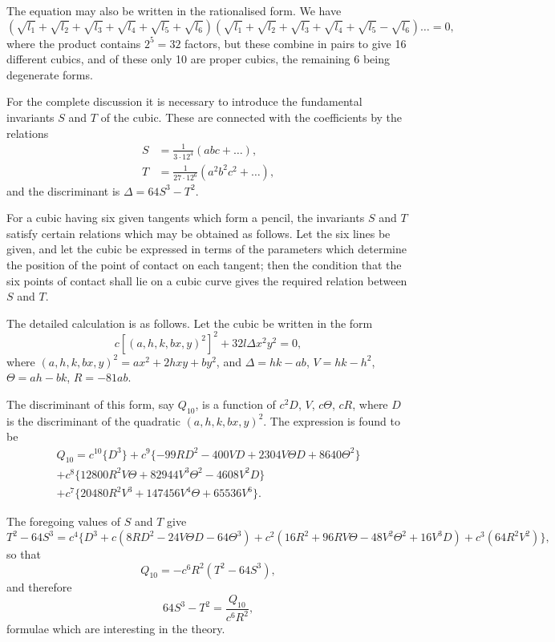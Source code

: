 \documentclass[11pt,a4paper]{article}
\theoremstyle{definition}
\begin{document}
The equation may also be written in the rationalised form. We have
\[
(\sqrt{l_1} + \sqrt{l_2} + \sqrt{l_3} + \sqrt{l_4} + \sqrt{l_5} + \sqrt{l_6})(\sqrt{l_1} + \sqrt{l_2} + \sqrt{l_3} + \sqrt{l_4} + \sqrt{l_5} - \sqrt{l_6}) \dots = 0,
\]
where the product contains $2^5 = 32$ factors, but these combine in pairs to give 16 different cubics, and of these only 10 are proper cubics, the remaining 6 being degenerate forms.

For the complete discussion it is necessary to introduce the fundamental invariants $S$ and $T$ of the cubic. These are connected with the coefficients by the relations
\begin{align*}
S &= \frac{1}{3\cdot 12^4}(abc + \dots),\\
T &= \frac{1}{27\cdot 12^6}(a^2b^2c^2 + \dots),
\end{align*}
and the discriminant is $\Delta = 64S^3 - T^2$.

For a cubic having six given tangents which form a pencil, the invariants $S$ and $T$ satisfy certain relations which may be obtained as follows. Let the six lines be given, and let the cubic be expressed in terms of the parameters which determine the position of the point of contact on each tangent; then the condition that the six points of contact shall lie on a cubic curve gives the required relation between $S$ and $T$.

\newpage

The detailed calculation is as follows. Let the cubic be written in the form
\[
c[(a,h,k,b x,y)^2]^2 + 32l\Delta x^2y^2 = 0,
\]
where $(a,h,k,b x,y)^2 = ax^2 + 2hxy + by^2$, and $\Delta = hk - ab$, $V = hk - h^2$, $\Theta = ah - bk$, $R = -81ab$.

The discriminant of this form, say $Q_{10}$, is a function of $c^2D$, $V$, $c\Theta$, $cR$, where $D$ is the discriminant of the quadratic $(a,h,k,b x,y)^2$. The expression is found to be
\begin{multline*}
Q_{10} = c^{10}\{D^3\} + c^9\{-99RD^2 - 400VD + 2304V\Theta D + 8640\Theta^2\} \\
+ c^8\{12800R^2V\Theta + 82944V^3\Theta^2 - 4608V^2D\} \\
+ c^7\{20480R^2V^3 + 147456V^4\Theta + 65536V^6\}.
\end{multline*}

The foregoing values of $S$ and $T$ give
\[
T^2 - 64S^3 = c^4\{D^3 + c(8RD^2 - 24V\Theta D - 64\Theta^3) + c^2(16R^2 + 96RV\Theta - 48V^2\Theta^2 + 16V^3D) + c^3(64R^2V^2)\},
\]
so that
\[
Q_{10} = -c^6R^2(T^2 - 64S^3),
\]
and therefore
\[
64S^3 - T^2 = \frac{Q_{10}}{c^6R^2},
\]
formulae which are interesting in the theory.
\end{document}
